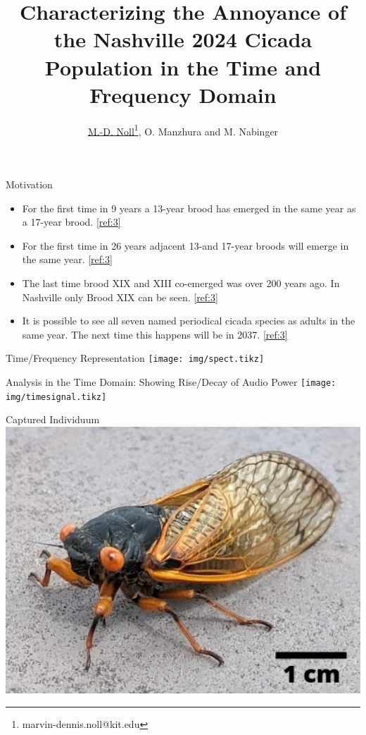\documentclass[english]{article}
\title{Characterizing the Annoyance of the Nashville 2024 Cicada Population in the Time and Frequency Domain}
\author{\underline{M.-D. Noll}\thanks{marvin-dennis.noll@kit.edu}, O. Manzhura and M. Nabinger
}
\institute{}
\def\boxheight{200mm}
\def\boxsep{6mm}
\begin{document}
	\maketitle
	\vspace{-40mm}
	
	\begin{boxgrayw}[\boxheight]{Motivation}{}
		\begin{itemize}
			\item For the first time in 9 years a 13-year brood has emerged in the same year as a 17-year brood. \ref{ref:3}
            \item For the first time in 26 years adjacent 13-and 17-year broods will emerge in the same year. \ref{ref:3}
            \item The last time brood XIX and XIII co-emerged was over 200 years ago. In Nashville only Brood XIX can be seen. \ref{ref:3}
            \item It is possible to see all seven named periodical cicada species as adults in the same year. The next time this happens will be in 2037. \ref{ref:3}
		\end{itemize}
	\end{boxgrayw}
	\begin{boxgray2w}[\boxheight]{Time/Frequency Representation}{}
		\texttt{[image: img/spect.tikz]}
	\end{boxgray2w}
	\vskip\boxsep
	\begin{boxgray2w}[\boxheight]{Analysis in the Time Domain: Showing Rise/Decay of Audio Power}{}
		\texttt{[image: img/timesignal.tikz]}
	\end{boxgray2w}
	\begin{boxgrayw}[\boxheight]{Captured Individuum}{}
		\includegraphics[width=205mm]{img/vieh2.png}
	\end{boxgrayw}
\end{document}
